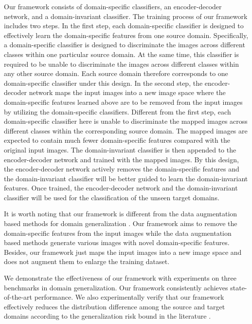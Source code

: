 \documentclass{article}
\begin{document}
Our framework consists of domain-specific classifiers, an encoder-decoder network, and a domain-invariant classifier. The training process of our framework includes two steps. In the first step, each domain-specific classifier is designed to effectively learn the domain-specific features from one source domain. Specifically, a domain-specific classifier is designed to discriminate the images across different classes within one particular source domain. At the same time, this classifier is required to be unable to discriminate the images across different classes within any other source domain. Each source domain therefore corresponds to one domain-specific classifier under this design. In the second step, the encoder-decoder network maps the input images into a new image space where the domain-specific features learned above are to be removed from the input images by utilizing the domain-specific classifiers. Different from the first step, each domain-specific classifier here is unable to discriminate the mapped images across different classes within the corresponding source domain. The mapped images are expected to contain much fewer domain-specific features compared with the original input images. The domain-invariant classifier is then appended to the encoder-decoder network and trained with the mapped images. By this design, the encoder-decoder network actively removes the domain-specific features and the domain-invariant classifier will be better guided to learn the domain-invariant features. Once trained, the encoder-decoder network and the domain-invariant classifier will be used for the classification of the unseen target domains. 

It is worth noting that our framework is different from the data augmentation based methods for domain generalization \cite{xu2020robust,nam2021reducing,zhou2020domain,borlino2021rethinking}. Our framework aims to remove the domain-specific features from the input images while the data augmentation based methods generate various images with novel domain-specific features. Besides, our framework just maps the input images into a new image space and does not augment them to enlarge the training dataset.

We demonstrate the effectiveness of our framework with experiments on three benchmarks in domain generalization. Our framework consistently achieves state-of-the-art performance. We also experimentally verify that our framework effectively reduces the distribution difference among the source and target domains according to the generalization risk bound in the literature \cite{albuquerque2019generalizing}.
\end{document}
